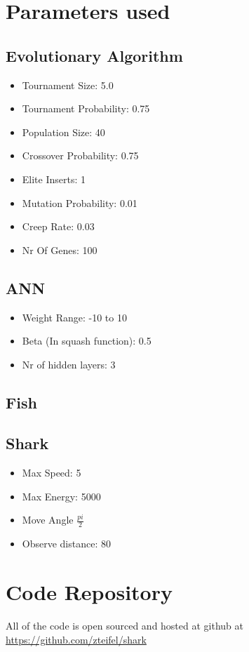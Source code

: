 \section{Parameters used\label{app:param}}
\subsection{Evolutionary Algorithm}
\begin{itemize}
\item Tournament Size: 5.0
\item Tournament Probability: 0.75
\item Population Size: 40
\item Crossover Probability: 0.75
\item Elite Inserts: 1
\item Mutation Probability: 0.01
\item Creep Rate: 0.03
\item Nr Of Genes: 100
\end{itemize}

\subsection{ANN}
\begin{itemize}
\item Weight Range: -10 to 10
\item Beta (In squash function): 0.5
\item Nr of hidden layers: 3
\end{itemize}

\subsection{Fish}

\subsection{Shark}
\begin{itemize}
\item Max Speed: 5
\item Max Energy: 5000
\item Move Angle $\frac{pi}{2}$
\item Observe distance: 80
\end{itemize}

\section{Code Repository}
All of the code is open sourced and hosted at github at \url{https://github.com/zteifel/shark}

